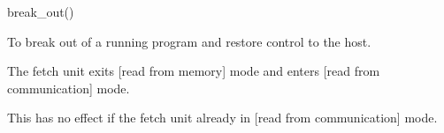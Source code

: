 

\format
break\_out()

\purpose

To break out of a running program and restore control to the host.

\description

The fetch unit exits [read from memory] mode and enters [read from communication] mode.

\notes

This has no effect if the fetch unit already in [read from communication] mode.
